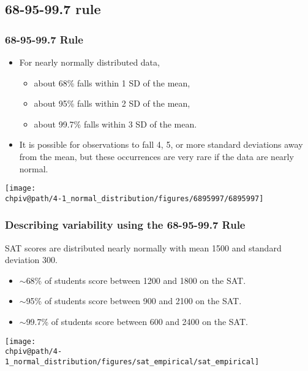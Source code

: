 \documentclass[slidestop,compress,mathserif]{beamer}
\makeatletter
\def\chpiv@path{../../Chp 4}
\makeatother
\begin{document}

\subsection{68-95-99.7 rule}


\begin{frame}
\frametitle{68-95-99.7 Rule}

\begin{itemize}

\item For nearly normally distributed data, 
\begin{itemize}
\item about 68\% falls within 1 SD of the mean,
\item about 95\% falls within 2 SD of the mean,
\item about 99.7\% falls within 3 SD of the mean.
\end{itemize}

\item It is possible for observations to fall 4, 5, or more standard deviations away from the mean, but these occurrences are very rare if the data are nearly normal.

\end{itemize}

\begin{center}
\texttt{[image: \\chpiv@path/4-1\_normal\_distribution/figures/6895997/6895997]}
\end{center}

\end{frame}


\begin{frame}
\frametitle{Describing variability using the 68-95-99.7 Rule}

SAT scores are distributed nearly normally with mean 1500 and standard deviation 300.

\pause
\begin{itemize}

\item $\sim$68\% of students score between 1200 and 1800 on the SAT. 

\item $\sim$95\% of students score between 900 and 2100 on the SAT. 

\item $\sim$99.7\% of students score between 600 and 2400 on the SAT. 

\end{itemize}

\begin{center}
\texttt{[image: \\chpiv@path/4-1\_normal\_distribution/figures/sat\_empirical/sat\_empirical]}
\end{center}

\end{frame}
\end{document}
